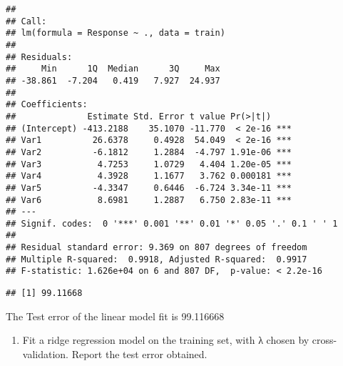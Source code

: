 \documentclass[
]{article}
\newenvironment{Shaded}{\begin{snugshade}}{\end{snugshade}}
\newcommand{\AttributeTok}[1]{\textcolor[rgb]{0.77,0.63,0.00}{#1}}
\newcommand{\CommentTok}[1]{\textcolor[rgb]{0.56,0.35,0.01}{\textit{#1}}}
\newcommand{\DecValTok}[1]{\textcolor[rgb]{0.00,0.00,0.81}{#1}}
\newcommand{\FunctionTok}[1]{\textcolor[rgb]{0.00,0.00,0.00}{#1}}
\newcommand{\NormalTok}[1]{#1}
\newcommand{\OtherTok}[1]{\textcolor[rgb]{0.56,0.35,0.01}{#1}}
\newcommand{\SpecialCharTok}[1]{\textcolor[rgb]{0.00,0.00,0.00}{#1}}
\providecommand{\tightlist}{%
  \setlength{\itemsep}{0pt}\setlength{\parskip}{0pt}}
\begin{document}
\begin{verbatim}
## 
## Call:
## lm(formula = Response ~ ., data = train)
## 
## Residuals:
##     Min      1Q  Median      3Q     Max 
## -38.861  -7.204   0.419   7.927  24.937 
## 
## Coefficients:
##              Estimate Std. Error t value Pr(>|t|)    
## (Intercept) -413.2188    35.1070 -11.770  < 2e-16 ***
## Var1          26.6378     0.4928  54.049  < 2e-16 ***
## Var2          -6.1812     1.2884  -4.797 1.91e-06 ***
## Var3           4.7253     1.0729   4.404 1.20e-05 ***
## Var4           4.3928     1.1677   3.762 0.000181 ***
## Var5          -4.3347     0.6446  -6.724 3.34e-11 ***
## Var6           8.6981     1.2887   6.750 2.83e-11 ***
## ---
## Signif. codes:  0 '***' 0.001 '**' 0.01 '*' 0.05 '.' 0.1 ' ' 1
## 
## Residual standard error: 9.369 on 807 degrees of freedom
## Multiple R-squared:  0.9918, Adjusted R-squared:  0.9917 
## F-statistic: 1.626e+04 on 6 and 807 DF,  p-value: < 2.2e-16
\end{verbatim}

\begin{Shaded}
\end{Shaded}

\begin{verbatim}
## [1] 99.11668
\end{verbatim}

The Test error of the linear model fit is 99.116668

\begin{enumerate}
\def\labelenumi{\alph{enumi})}
\setcounter{enumi}{2}
\tightlist
\item
  Fit a ridge regression model on the training set, with λ chosen by
  cross-validation. Report the test error obtained.
\end{enumerate}
\end{document}
